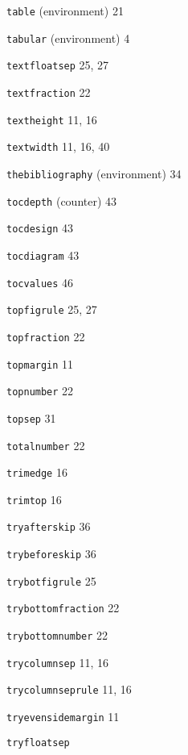 \documentclass[11pt]{article}
\providecommand{\indexfill}{}
\begin{document}
\begin{theindex}
\item \texttt  {table} (environment)  \indexfill
   21
\item \texttt  {tabular} (environment)  \indexfill
   4
\item \texttt  {\bs textfloatsep}  \indexfill
   25, 27
\item \texttt  {\bs textfraction}  \indexfill
   22
\item \texttt  {\bs textheight}  \indexfill
   11, 16
\item \texttt  {\bs textwidth}  \indexfill
   11, 16, 40
\item \texttt  {thebibliography} (environment)  \indexfill
   34
\item \texttt  {tocdepth} (counter)  \indexfill
   43
\item \texttt  {\bs tocdesign}  \indexfill
   43
\item \texttt  {\bs tocdiagram}  \indexfill
   43
\item \texttt  {\bs tocvalues}  \indexfill
   46
\item \texttt  {\bs topfigrule}  \indexfill
   25, 27
\item \texttt  {\bs topfraction}  \indexfill
   22
\item \texttt  {\bs topmargin}  \indexfill
   11
\item \texttt  {\bs topnumber}  \indexfill
   22
\item \texttt  {\bs topsep}  \indexfill
   31
\item \texttt  {\bs totalnumber}  \indexfill
   22
\item \texttt  {\bs trimedge}  \indexfill
   16
\item \texttt  {\bs trimtop}  \indexfill
   16
\item \texttt  {\bs tryafterskip}  \indexfill
   36
\item \texttt  {\bs trybeforeskip}  \indexfill
   36
\item \texttt  {\bs trybotfigrule}  \indexfill
   25
\item \texttt  {\bs trybottomfraction}  \indexfill
   22
\item \texttt  {\bs trybottomnumber}  \indexfill
   22
\item \texttt  {\bs trycolumnsep}  \indexfill
   11, 16
\item \texttt  {\bs trycolumnseprule}  \indexfill
   11, 16
\item \texttt  {\bs tryevensidemargin}  \indexfill
   11
\item \texttt  {\bs tryfloatsep}  \indexfill

\end{theindex}
\end{document}
